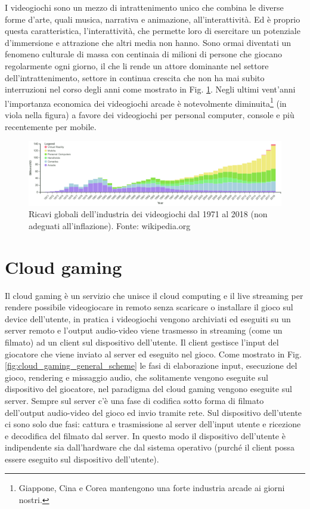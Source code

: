 I videogiochi sono un mezzo di intrattenimento unico che combina le diverse forme d'arte, quali musica, narrativa e animazione, all'interattività. Ed è proprio questa caratteristica, l'interattività, che permette loro di esercitare un potenziale d'immersione e attrazione che altri media non hanno. Sono ormai diventati un fenomeno culturale di massa con centinaia di milioni di persone che giocano regolarmente ogni giorno, il che li rende un attore dominante nel settore dell'intrattenimento, settore in continua crescita che non ha mai subito interruzioni nel corso degli anni come mostrato in Fig. \ref{fig:valore_commerciale_giochi_globale}. Negli ultimi vent'anni l'importanza economica dei videogiochi arcade è notevolmente diminuita\footnote{Giappone, Cina e Corea mantengono una forte industria arcade ai giorni nostri.} (in viola nella figura) a favore dei videogiochi per personal computer, console e più recentemente per mobile.

\begin{figure}[H]
	\includegraphics[width=\linewidth]{immagini/valore_commerciale_giochi_globale.png}
	\caption{Ricavi globali dell'industria dei videogiochi dal 1971 al 2018 (non adeguati all'inflazione). Fonte: wikipedia.org}
	\label{fig:valore_commerciale_giochi_globale}
\end{figure}




\section{Cloud gaming}
Il cloud gaming è un servizio che unisce il cloud computing e il live streaming per rendere possibile videogiocare in remoto senza scaricare o installare il gioco sul device dell'utente, in pratica i videogiochi vengono archiviati ed eseguiti su un server remoto e l'output audio-video viene trasmesso in streaming (come un filmato) ad un client sul dispositivo dell'utente. Il client gestisce l'input del giocatore che viene inviato al server ed eseguito nel gioco. Come mostrato in Fig. \ref{fig:cloud_gaming_general_scheme} le fasi di elaborazione input, esecuzione del gioco, rendering e missaggio audio, che solitamente vengono eseguite sul dispositivo del giocatore, nel paradigma del cloud gaming vengono eseguite sul server. Sempre sul server c'è una fase di codifica sotto forma di filmato dell'output audio-video del gioco ed invio tramite rete. Sul dispositivo dell'utente ci sono solo due fasi: cattura e trasmissione al server dell'input utente e ricezione e decodifica del filmato dal server. In questo modo il dispositivo dell'utente è indipendente sia dall'hardware che dal sistema operativo (purché il client possa essere eseguito sul dispositivo dell'utente).

